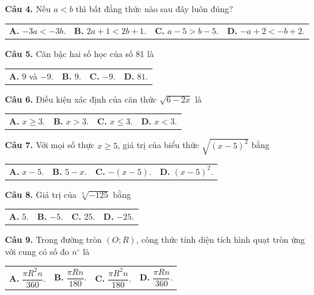 \documentclass[11pt,a4paper]{article}
\begin{document}
\vspace{1.5mm}
\textbf{Câu 4.} Nếu $a < b$ thì bất đẳng thức nào sau đây luôn đúng?\\
\begin{tabularx}{\linewidth}{XXXX}
\textbf{A.} $-3a < -3b$. & \textbf{B.} $2a + 1 < 2b + 1$. & \textbf{C.} $a - 5 > b - 5$. & \textbf{D.} $-a + 2 < -b + 2$.
\end{tabularx}

\vspace{1.5mm}
\textbf{Câu 5.} Căn bậc hai số học của số 81 là\\
\begin{tabularx}{\linewidth}{XXXX}
\textbf{A.} $9$ và $-9$. & \textbf{B.} $9$. & \textbf{C.} $-9$. & \textbf{D.} $81$.
\end{tabularx}

\vspace{1.5mm}
\textbf{Câu 6.} Điều kiện xác định của căn thức $\sqrt{6 - 2x}$ là\\
\begin{tabularx}{\linewidth}{XXXX}
\textbf{A.} $x \ge 3$. & \textbf{B.} $x > 3$. & \textbf{C.} $x \le 3$. & \textbf{D.} $x < 3$.
\end{tabularx}

\vspace{1.5mm}
\textbf{Câu 7.} Với mọi số thực $x \ge 5$, giá trị của biểu thức $\sqrt{(x-5)^2}$ bằng\\
\begin{tabularx}{\linewidth}{XXXX}
\textbf{A.} $x - 5$. & \textbf{B.} $5 - x$. & \textbf{C.} $-(x-5)$. & \textbf{D.} $(x-5)^2$.
\end{tabularx}

\vspace{1.5mm}
\textbf{Câu 8.} Giá trị của $\sqrt[3]{-125}$ bằng\\
\begin{tabularx}{\linewidth}{XXXX}
\textbf{A.} $5$. & \textbf{B.} $-5$. & \textbf{C.} $25$. & \textbf{D.} $-25$.
\end{tabularx}

\vspace{1.5mm}
\textbf{Câu 9.} Trong đường tròn $(O; R)$, công thức tính diện tích hình quạt tròn ứng với cung có số đo $n^\circ$ là\\
\begin{tabularx}{\linewidth}{XXXX}
\textbf{A.} $\dfrac{\pi R^2 n}{360}$. & \textbf{B.} $\dfrac{\pi R n}{180}$. & \textbf{C.} $\dfrac{\pi R^2 n}{180}$. & \textbf{D.} $\dfrac{\pi R n}{360}$.
\end{tabularx}
\end{document}
